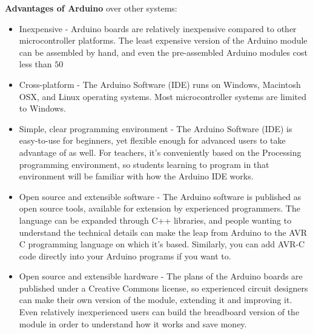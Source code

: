 \documentclass[a4paper]{article}
\begin{document}
\medskip
\textbf{Advantages of Arduino} over other systems:
\begin{itemize}
    \item Inexpensive - Arduino boards are relatively inexpensive compared to other microcontroller platforms. The least expensive version of the Arduino module can be assembled by hand, and even the pre-assembled Arduino modules cost less than $50$
    \item Cross-platform - The Arduino Software (IDE) runs on Windows, Macintosh OSX, and Linux operating systems. Most microcontroller systems are limited to Windows.
    \item Simple, clear programming environment - The Arduino Software (IDE) is easy-to-use for beginners, yet flexible enough for advanced users to take advantage of as well. For teachers, it's conveniently based on the Processing programming environment, so students learning to program in that environment will be familiar with how the Arduino IDE works.
    \item Open source and extensible software - The Arduino software is published as open source tools, available for extension by experienced programmers. The language can be expanded through C++ libraries, and people wanting to understand the technical details can make the leap from Arduino to the AVR C programming language on which it's based. Similarly, you can add AVR-C code directly into your Arduino programs if you want to.
    \item Open source and extensible hardware - The plans of the Arduino boards are published under a Creative Commons license, so experienced circuit designers can make their own version of the module, extending it and improving it. Even relatively inexperienced users can build the breadboard version of the module in order to understand how it works and save money.
\end{itemize}
\end{document}
